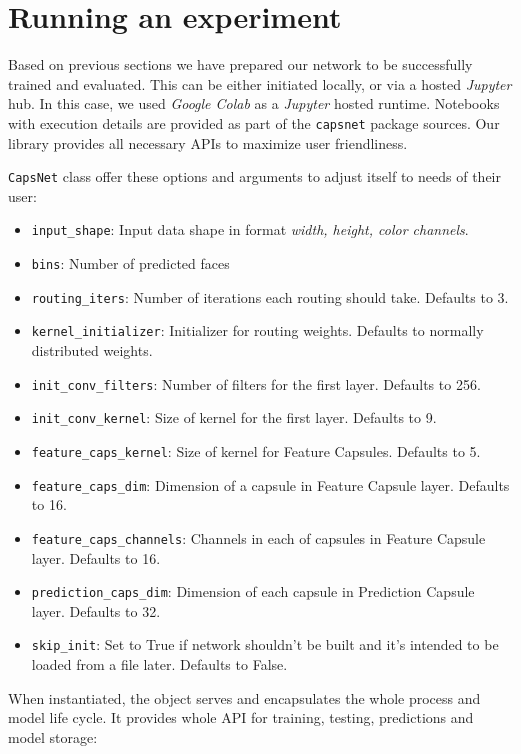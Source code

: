 \section{Running an experiment}

Based on previous sections we have prepared our network to be successfully trained and evaluated. This can be either initiated locally, or via a hosted \textit{Jupyter} hub. In this case, we used \textit{Google Colab} as a \textit{Jupyter} hosted runtime. Notebooks with execution details are provided as part of the \texttt{capsnet} package sources. Our library provides all necessary APIs to maximize user friendliness.


\texttt{CapsNet} class offer these options and arguments to adjust itself to needs of their user:

\begin{itemize}
    \item \texttt{input\_shape}: Input data shape in format \textit{width, height, color channels}.
    \item \texttt{bins}: Number of predicted faces
    \item \texttt{routing\_iters}: Number of iterations each routing should take. Defaults to 3.
    \item \texttt{kernel\_initializer}: Initializer for routing weights. Defaults to normally distributed weights.
    \item \texttt{init\_conv\_filters}: Number of filters for the first layer. Defaults to 256.
    \item \texttt{init\_conv\_kernel}: Size of kernel for the first layer. Defaults to 9.
    \item \texttt{feature\_caps\_kernel}: Size of kernel for Feature Capsules. Defaults to 5.
    \item \texttt{feature\_caps\_dim}: Dimension of a capsule in Feature Capsule layer. Defaults to 16.
    \item \texttt{feature\_caps\_channels}: Channels in each of capsules in Feature Capsule layer. Defaults to 16.
    \item \texttt{prediction\_caps\_dim}: Dimension of each capsule in Prediction Capsule layer. Defaults to 32.
    \item \texttt{skip\_init}: Set to True if network shouldn't be built and it's intended to be loaded from a file later. Defaults to False.
\end{itemize}

When instantiated, the object serves and encapsulates the whole process and model life cycle. It provides whole API for training, testing, predictions and model storage:

